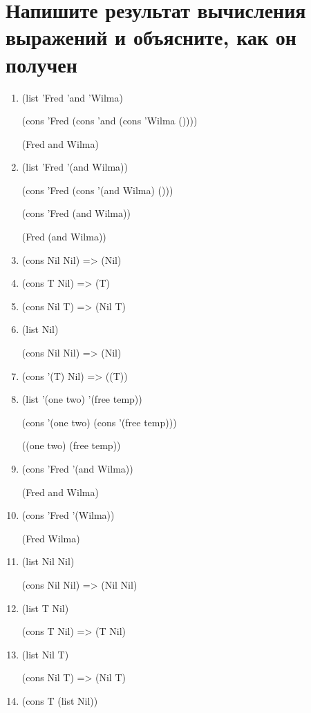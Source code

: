 \section{Напишите результат вычисления выражений и объясните, как он получен}
\begin{enumerate}
	\item (list 'Fred 'and 'Wilma)
	
	(cons 'Fred (cons 'and (cons 'Wilma ())))
	
	(Fred and Wilma)
	
	\item (list 'Fred '(and Wilma))
	
	(cons 'Fred (cons '(and Wilma) ()))
	
	(cons 'Fred (and Wilma))
	
	(Fred (and Wilma))
	
	\item (cons Nil Nil) => (Nil)
	
	\item (cons T Nil) => (T)
	\item (cons Nil T) => (Nil T)
	\item (list Nil)
	
	(cons Nil Nil) => (Nil)
		
	\item (cons '(T) Nil) => ((T))
	
	\item (list '(one two) '(free temp))
	
	(cons '(one two) (cons '(free temp)))
	
	((one two) (free temp))
	
	\item (cons 'Fred '(and Wilma))
	
	(Fred and Wilma)
	
	\item (cons 'Fred '(Wilma))
	
	(Fred Wilma)
	
	\item (list Nil Nil)
	
	(cons Nil Nil) => (Nil Nil)
	
	\item (list T Nil)
	
	(cons T Nil) => (T Nil)
	
	\item (list Nil T)
	
	(cons Nil T) => (Nil T)
	
	\item (cons T (list Nil))
	

\end{enumerate}
